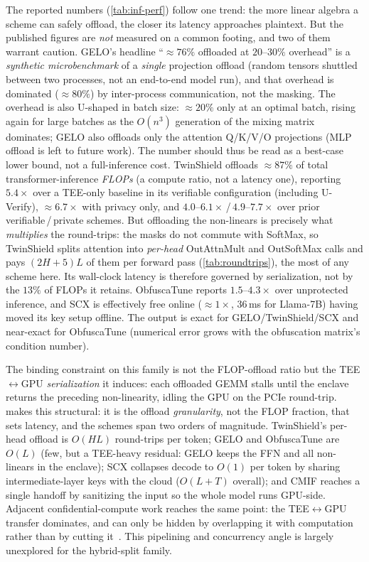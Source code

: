The reported numbers (\cref{tab:inf-perf}) follow one trend: the more linear algebra a
scheme can safely offload, the closer its latency approaches plaintext. But the published figures are
\emph{not} measured on a common footing, and two of them warrant caution.
GELO's headline ``${\approx}76\%$ offloaded at $20$--$30\%$ overhead'' is a
\emph{synthetic microbenchmark} of a \emph{single} projection offload (random tensors
shuttled between two processes, not an end-to-end model run), and that overhead is
dominated ($\approx$$80\%$) by inter-process communication, not the masking. The overhead is also U-shaped in batch size: ${\approx}20\%$ only at an optimal batch, rising again for large
batches as the $O(n^3)$ generation of the mixing matrix dominates; GELO also offloads only
the attention Q/K/V/O projections (MLP offload is left to future work). The number should
thus be read as a best-case lower bound, not a full-inference cost.
TwinShield offloads ${\approx}87\%$ of total transformer-inference \emph{FLOPs} (a compute
ratio, not a latency one), reporting $5.4\times$ over a TEE-only baseline in its verifiable
configuration (including U-Verify), ${\approx}6.7\times$ with privacy only, and
$4.0$--$6.1\times$\,/\,$4.9$--$7.7\times$ over prior verifiable\,/\,private schemes. But
offloading the non-linears is precisely what \emph{multiplies} the round-trips: the masks do not
commute with SoftMax, so TwinShield splits attention into \emph{per-head} OutAttnMult and
OutSoftMax calls and pays $(2H{+}5)L$ of them per forward pass
(\cref{tab:roundtrips}), the most of any scheme here. Its wall-clock latency is therefore
governed by serialization, not by the $13\%$ of FLOPs it retains. ObfuscaTune reports $1.5$--$4.3\times$ over unprotected
inference, and SCX is effectively free online ($\approx$$1\times$, $36$\,ms for Llama-7B)
having moved its key setup offline. The output is exact for GELO/TwinShield/SCX and
near-exact for ObfuscaTune (numerical error grows with the obfuscation matrix's condition
number).

The binding constraint on this family is not the FLOP-offload ratio but the
TEE$\leftrightarrow$GPU \emph{serialization} it induces: each offloaded GEMM stalls until
the enclave returns the preceding non-linearity, idling the GPU on the PCIe round-trip.
 makes this structural: it is the offload \emph{granularity}, not the
FLOP fraction, that sets latency, and the schemes span two orders of magnitude. TwinShield's
per-head offload is $O(HL)$ round-trips per token; GELO and ObfuscaTune are $O(L)$ (few,
but a TEE-heavy residual: GELO keeps the FFN and all non-linears in the enclave);
SCX collapses decode to $O(1)$ per token by sharing intermediate-layer keys with the cloud
($O(L{+}T)$ overall); and CMIF reaches a single handoff by sanitizing the input so the whole
model runs GPU-side. Adjacent confidential-compute work reaches the same point: the
TEE$\leftrightarrow$GPU transfer dominates, and can only be hidden by overlapping it with computation rather than by cutting it~\citep{secureinfer,pipellm}. This pipelining and concurrency angle is
largely unexplored for the hybrid-split family.

